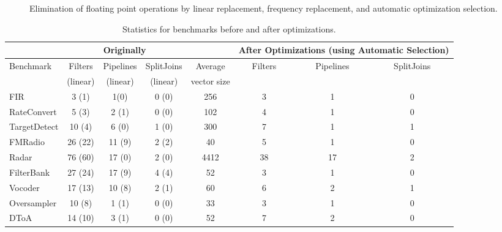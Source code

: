 \begin{figure}[t]
\vspace{-16pt}
\vspace{-16pt}
\caption{Elimination of floating point operations by linear replacement, frequency replacement, and automatic optimization selection.}
\label{fig:flops}
\vspace{-12pt}
\end{figure}

\begin{table*}[t]
\vspace{-16pt}
\centering
\small
\begin{tabular}{|l|c|c|c||c||c|c|c|} 
\hline
& \multicolumn{3}{|c||}{Originally}  &             & \multicolumn{3}{|c|}{After Optimizations (using Automatic Selection)} \\
\hline
Benchmark  & Filters & Pipelines& SplitJoins & Average     & Filters      & Pipelines         & SplitJoins \\
           & (linear)& (linear) & (linear)   & vector size &              &                   &            \\
\hline
FIR        & 3 (1)   & 1(0)     & 0 (0)      & 256         & 3            & 1                 & 0 \\
\hline
RateConvert& 5 (3)   & 2 (1)    & 0 (0)      & 102         & 4            & 1                 & 0 \\
\hline
TargetDetect& 10 (4) & 6 (0)    & 1 (0)      & 300         & 7            & 1                 & 1 \\
\hline
FMRadio    & 26 (22) & 11 (9)   & 2 (2)      & 40          & 5            & 1                 & 0 \\
\hline
Radar      & 76 (60) & 17 (0)   & 2 (0)      & 4412        & 38           & 17                & 2 \\
\hline
FilterBank & 27 (24) & 17 (9)   & 4 (4)      & 52          & 3            & 1                 & 0 \\
\hline
Vocoder    & 17 (13) & 10 (8)   & 2 (1)      & 60          & 6            & 2                 & 1 \\
\hline
Oversampler& 10 (8) & 1 (1)     & 0 (0)      & 33          & 3            & 1                 & 0 \\
\hline
DToA       & 14 (10) & 3 (1)    & 0 (0)      & 52          & 7            & 2                 & 0 \\
\hline
\end{tabular}
\vspace{-3pt}
\caption{Statistics for benchmarks before and after optimizations.
\protect\label{fig:benchmark-statistics}}
\vspace{-8pt}
\end{table*}

